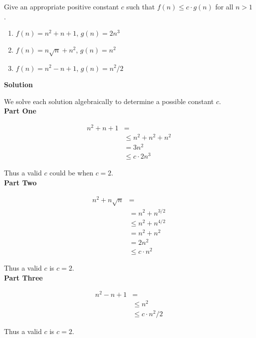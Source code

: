 \begin{homeworkProblem}
	Give an appropriate positive constant \(c\) such that \(f(n) \leq c \cdot
	g(n)\) for all \(n > 1\).
	
	\begin{enumerate}
		\item \(f(n) = n^2 + n + 1\), \(g(n) = 2n^3\)
		\item \(f(n) = n\sqrt{n} + n^2\), \(g(n) = n^2\)
		\item \(f(n) = n^2 - n + 1\), \(g(n) = n^2 / 2\)
	\end{enumerate}
	
	\textbf{Solution}
	
	We solve each solution algebraically to determine a possible constant
	\(c\).
	\\
	
	\textbf{Part One}
	
	\[
	\begin{split}
		n^2 + n + 1 &=
		\\
		&\leq n^2 + n^2 + n^2
		\\
		&= 3n^2
		\\
		&\leq c \cdot 2n^3
	\end{split}
	\]
	
	Thus a valid \(c\) could be when \(c = 2\).
	\\
	
	\textbf{Part Two}
	
	\[
	\begin{split}
		n^2 + n\sqrt{n} &=
		\\
		&= n^2 + n^{3/2}
		\\
		&\leq n^2 + n^{4/2}
		\\
		&= n^2 + n^2
		\\
		&= 2n^2
		\\
		&\leq c \cdot n^2
	\end{split}
	\]
	
	Thus a valid \(c\) is \(c = 2\).
	\\
	
	\textbf{Part Three}
	
	\[
	\begin{split}
		n^2 - n + 1 &=
		\\
		&\leq n^2
		\\
		&\leq c \cdot n^2/2
	\end{split}
	\]
	
	Thus a valid \(c\) is \(c = 2\).
	
\end{homeworkProblem}

